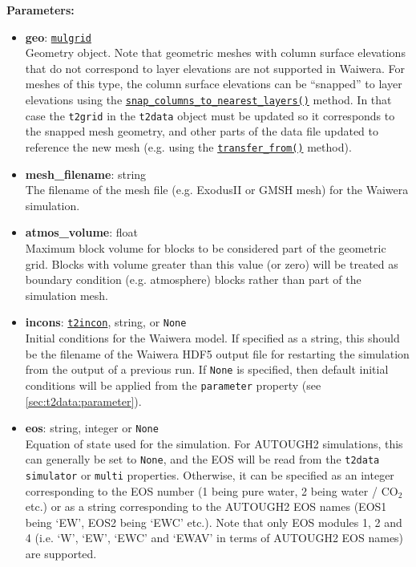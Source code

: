 \textbf{Parameters:}
\begin{itemize}
\item \textbf{geo}: \hyperref[mulgrids]{\texttt{mulgrid}}\\
  Geometry object. Note that geometric meshes with column surface elevations that do not correspond to layer elevations are not supported in Waiwera. For meshes of this type, the column surface elevations can be ``snapped'' to layer elevations using the \hyperref[sec:mulgrid:snap_columns_to_nearest_layers]{\texttt{snap\_columns\_to\_nearest\_layers()}} method. In that case the \texttt{t2grid} in the \texttt{t2data} object must be updated so it corresponds to the snapped mesh geometry, and other parts of the data file updated to reference the new mesh (e.g. using the \hyperref[sec:t2data:transfer_from]{\texttt{transfer\_from()}} method).
\item \textbf{mesh\_filename}: string\\
  The filename of the mesh file (e.g. ExodusII or GMSH mesh) for the Waiwera simulation.
\item \textbf{atmos\_volume}: float\\
  Maximum block volume for blocks to be considered part of the geometric grid. Blocks with volume greater than this value (or zero) will be treated as boundary condition (e.g. atmosphere) blocks rather than part of the simulation mesh.
\item \textbf{incons}: \hyperref[incons]{\texttt{t2incon}}, string, or \texttt{None}\\
  Initial conditions for the Waiwera model. If specified as a string, this should be the filename of the Waiwera HDF5 output file for restarting the simulation from the output of a previous run. If \texttt{None} is specified, then default initial conditions will be applied from the \texttt{parameter} property (see \ref{sec:t2data:parameter}).  
\item \textbf{eos}: string, integer or \texttt{None}\\
  Equation of state used for the simulation. For AUTOUGH2 simulations, this can generally be set to \texttt{None}, and the EOS will be read from the \texttt{t2data} \texttt{simulator} or \texttt{multi} properties. Otherwise, it can be specified as an integer corresponding to the EOS number (1 being pure water, 2 being water / CO$_2$ etc.) or as a string corresponding to the AUTOUGH2 EOS names (EOS1 being `EW', EOS2 being `EWC' etc.). Note that only EOS modules 1, 2 and 4 (i.e. `W', `EW', `EWC' and `EWAV' in terms of AUTOUGH2 EOS names) are supported.

\end{itemize}
